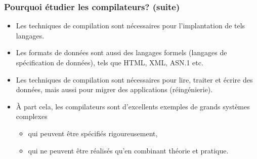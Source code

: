 %
\begin{frame}
\frametitle{Pourquoi étudier les compilateurs? (suite)}

\begin{itemize}

  \item Les techniques de compilation sont nécessaires pour
    l'implantation de tels langages.

  \item Les formats de données sont aussi des langages
    formels (langages de spécification de données), tels que HTML,
    XML, ASN.1 etc.

  \item Les techniques de compilation sont nécessaires pour
    lire, traiter et écrire des données, mais aussi pour migrer des
    applications (réingénierie).

  \item À part cela, les compilateurs sont d'excellents
    exemples de grands systèmes complexes

    \begin{itemize}

      \item qui peuvent être spécifiés rigoureusement,

      \item qui ne peuvent être réalisés qu'en combinant
        théorie et pratique.

    \end{itemize}

\end{itemize}

\end{frame}

